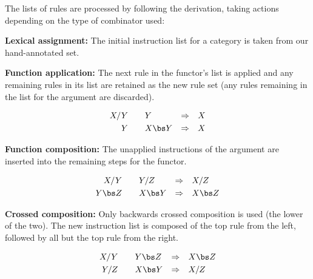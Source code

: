 The lists of rules are processed by following the \ccg derivation, taking actions depending on the type of combinator used:

\vspace{5mm}
\noindent
\textbf{Lexical assignment:} The initial instruction list for a category is taken from our hand-annotated set.

\vspace{3mm}
\noindent
\begin{minipage}[c]{0.6\textwidth}
\textbf{Function application:} The next rule in the functor's list is applied and any remaining rules in its list are retained as the new rule set (any rules remaining in the list for the argument are discarded).
\end{minipage}\hfill
\begin{minipage}[c]{0.3\textwidth}
\zerodisplayskips
\begin{align*}
  \cf{X / Y} \quad & \quad \cf{Y}       & \Rightarrow & \quad \cf{X} \\
  \cf{Y}     \quad & \quad \cf{X \bs Y} & \Rightarrow & \quad \cf{X}
\end{align*}
\end{minipage}

\vspace{3mm}
\noindent
\begin{minipage}[c]{0.6\textwidth}
\textbf{Function composition:} The unapplied instructions of the argument are inserted into the remaining steps for the functor.
\end{minipage}\hfill
\begin{minipage}[c]{0.3\textwidth}
\zerodisplayskips
\begin{align*}
  \cf{X / Y} \quad   & \quad \cf{Y / Z}   & \Rightarrow & \quad \cf{X / Z} \\
  \cf{Y \bs Z} \quad & \quad \cf{X \bs Y} & \Rightarrow & \quad \cf{X \bs Z}
\end{align*}
\end{minipage}

\vspace{3mm}
\noindent
\begin{minipage}[c]{0.6\textwidth}
\textbf{Crossed composition:}
Only backwards crossed composition is used (the lower of the two).
The new instruction list is composed of the top rule from the left, followed by all but the top rule from the right.
\end{minipage}\hfill
\begin{minipage}[c]{0.3\textwidth}
\zerodisplayskips
\begin{align*}
  \cf{X / Y} \quad & \quad \cf{Y \bs Z} & \Rightarrow & \quad \cf{X \bs Z} \\
  \cf{Y / Z} \quad & \quad \cf{X \bs Y} & \Rightarrow & \quad \cf{X / Z}
\end{align*}
\end{minipage}

